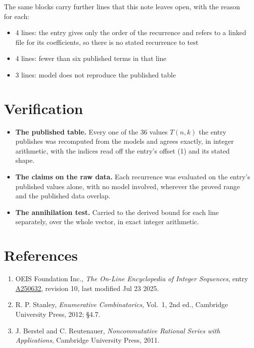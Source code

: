 \documentclass[11pt]{article}
\theoremstyle{definition}
\begin{document}
The same blocks carry further lines that this note leaves open, with the reason for each:

\begin{itemize}

\item 4 lines: the entry gives only the order of the recurrence and refers to a linked file for its coefficients, so there is no stated recurrence to test

\item 4 lines: fewer than six published terms in that line

\item 3 lines: model does not reproduce the published table

\end{itemize}

\section{Verification}

\begin{itemize}

\item {\bfseries The published table.} Every one of the 36 values $T(n,k)$ the entry publishes was recomputed from the models and agrees exactly, in integer arithmetic, with the indices read off the entry's offset (1) and its stated shape.

\item {\bfseries The claims on the raw data.} Each recurrence was evaluated on the entry's published values alone, with no model involved, wherever the proved range and the published data overlap.

\item {\bfseries The annihilation test.} Carried to the derived bound for each line separately, over the whole vector, in exact integer arithmetic.

\end{itemize}

\section{References}

\begin{enumerate}

\item OEIS Foundation Inc., \emph{The On-Line Encyclopedia of Integer Sequences}, entry \href{https://oeis.org/A250632}{A250632}, revision 10, last modified Jul 23 2025.

\item R. P. Stanley, \emph{Enumerative Combinatorics}, Vol.~1, 2nd ed., Cambridge University Press, 2012; \S4.7.

\item J. Berstel and C. Reutenauer, \emph{Noncommutative Rational Series with Applications}, Cambridge University Press, 2011.

\end{enumerate}
\end{document}

